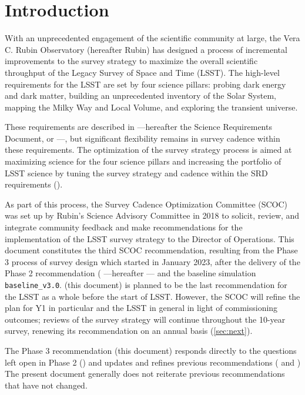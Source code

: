 \section{Introduction}

With an unprecedented engagement of the scientific community at large, the Vera C. Rubin Observatory (hereafter Rubin) has designed a process of incremental improvements to the survey strategy to maximize the overall scientific throughput of the Legacy Survey of Space and Time (LSST). The high-level requirements for the LSST are set by four science pillars: probing dark energy and dark matter, building an unprecedented inventory of the Solar System, mapping the Milky Way and Local Volume, and exploring the transient universe. 

These requirements are described in \cite{LPM-17} ---hereafter the Science Requirements Document, or ---, but significant flexibility remains in survey cadence within these requirements. The optimization of the survey strategy process is aimed at maximizing science for the four science pillars and increasing the portfolio of LSST science by tuning the survey strategy and cadence within the SRD requirements ().

As part of this process, the Survey Cadence Optimization Committee (SCOC) was set up by Rubin's Science Advisory Committee in 2018 to solicit, review, and integrate community feedback and make recommendations for the implementation of the LSST survey strategy to the Director of Operations. This document constitutes the third SCOC recommendation, resulting from the Phase 3 process of survey design which started in January 2023, after the delivery of the Phase 2 recommendation  (\citealt{PSTN-055} ---hereafter --- and the baseline simulation \texttt{baseline\_v3.0}. \cite{PSTN-056} (this document) is planned to be the last recommendation for the LSST as a whole before the start of LSST. However, the SCOC will refine the plan for Y1 in particular and the LSST in general in light of commissioning outcomes; reviews of the survey strategy will continue throughout the 10-year survey,  renewing its recommendation on an annual basis (\autoref{sec:next}). 

The Phase 3 recommendation (this document) responds directly to the questions left open in Phase 2 () and updates and refines previous recommendations ( and  ) The present document generally does not reiterate previous recommendations that have not changed.




